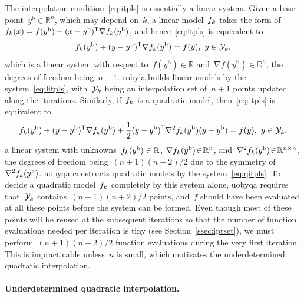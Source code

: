 \documentclass[
    smallextended,  %
    final,          %
]{svjour3}
\newcommand{\R}{\mathbb{R}}
\newcommand{\T}{\mathsf{T}}
\newcommand{\base}{{\text{b}}}
\newcommand{\objm}[1][k]{\obj\ifthenelse{\equal{#1}{}}{}{_{#1}}}
\newcommand{\obj}{f}
\newcommand{\xpt}[1][k]{\mathcal{Y}\ifthenelse{\equal{#1}{}}{}{_{#1}}}
\begin{document}
The interpolation condition~\eqref{eq:itpls} is essentially a linear system.
Given a base point~$y^{\base}\in \R^n$, which may depend on~$k$, a linear model~$\objm$ takes the
form of~$\objm(x) = \obj(y^{\base}) + (x - y^{\base})^{\T} \nabla \objm(y^{\base})$, and
hence~\eqref{eq:itpls} is equivalent to
\begin{equation}
    \label{eq:litpls}
    \objm(y^{\base}) + (y -y^{\base})^{\T} \nabla \objm(y^{\base})  = \obj(y),  ~ y \in \xpt,
\end{equation}
which is a linear system with respect to~$\obj(y^\base) \in \R$ and~$\nabla \obj(y^\base) \in \R^n$, the degrees of freedom being~$n+1$.
\Gls{cobyla} builds linear models by the system~\eqref{eq:litpls}, with~$\xpt$ being an interpolation
set of~$n+1$ points updated along the iterations.
Similarly, if~$\objm$ is a quadratic model, then~\eqref{eq:itpls} is equivalent to
\begin{equation}
    \label{eq:qitpls}
    \objm(y^{\base}) + (y -y^{\base})^{\T} \nabla \objm(y^{\base})
    + \frac{1}{2}(y-y^{\base})^{\T}  \nabla^2 \objm(y^{\base}) (y-y^{\base}) = \obj(y),  ~ y \in \xpt,
\end{equation}
a linear system with unknowns~$\objm(y^\base) \in \R$, $\nabla \objm(y^\base) \!\in\! \R^n$,
and~$\nabla^2 \objm(y^{\base})\!\in\!\R^{n \times n}$, the degrees of freedom being~$(n + 1)(n + 2) / 2$ due to the symmetry of~$\nabla^2 \objm(y^\base)$.
\gls{uobyqa} constructs quadratic models by the system~\eqref{eq:qitpls}.
To decide a quadratic model~$\objm$ completely by this system alone,
\gls{uobyqa} requires that~$\xpt$ contains~$(n+1)(n+2)/2$ points, and~$f$ should have been evaluated
at all these points before the system can be formed.
Even though most of these points will be reused at the subsequent iterations so that the number of
function evaluations needed per iteration is tiny (see Section~\ref{ssec:iptset}), we must perform~$(n + 1)(n + 2) / 2$ function evaluations during the very first iteration.
This is impracticable unless~$n$ is small, which motivates the underdetermined quadratic interpolation.

\paragraph{\textnormal{\textbf{Underdetermined quadratic interpolation.}}}
\end{document}
